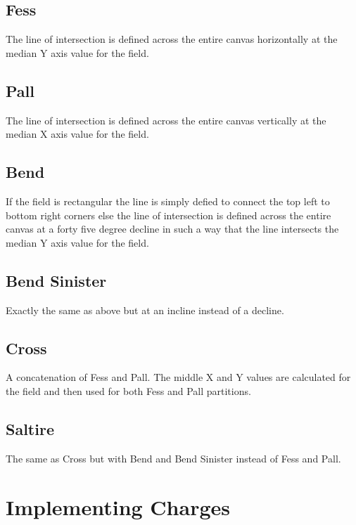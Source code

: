 \subsection{Fess}
The line of intersection is defined across the entire canvas horizontally at the median Y axis value for the field. 
\subsection{Pall}
The line of intersection is defined across the entire canvas vertically at the median X axis value for the field. 
\subsection{Bend}
If the field is rectangular the line is simply defied to connect the top left to bottom right corners else the line of intersection is defined across the entire canvas at a forty five degree decline in such a way that the line intersects the median Y axis value for the field.
\subsection{Bend Sinister}
Exactly the same as above but at an incline instead of a decline.
\subsection{Cross}
A concatenation of Fess and Pall. The middle X and Y values are calculated for the field and then used for both Fess and Pall partitions.
\subsection{Saltire}
The same as Cross but with Bend and Bend Sinister instead of Fess and Pall.

\section{Implementing Charges}




























